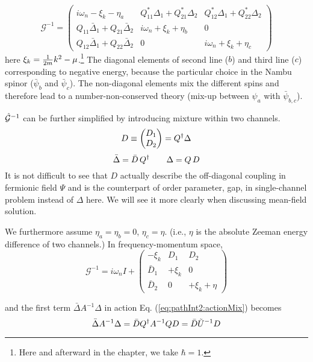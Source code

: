 \begin{equation}\label{eq:pathInt2:nGDeltaK}
\mathcal{G}^{-1}=
\begin{pmatrix}
i\omega_{n}-\xi_{k}-\eta_{a}&Q^{*}_{11}\Delta_{1}+Q^{*}_{21}\Delta_{2}&Q^{*}_{12}\Delta_{1}+Q^{*}_{22}\Delta_{2}\\
Q^{}_{11}\bar\Delta_{1}+Q^{}_{21}\bar\Delta_{2}&i\omega_{n}+\xi_{k}+\eta_{b}&0\\
Q^{}_{12}\bar\Delta_{1}+Q^{}_{22}\bar\Delta_{2}&0&i\omega_{n}+\xi_{k}+\eta_{c}
\end{pmatrix}
\end{equation}
here $\xi_{k}=\frac{1}{2m}k^{2}-\mu$.\footnote{Here and afterward in the chapter, we take $\hbar=1$.} The diagonal elements of second line (${b}$) and third line (${c}$) corresponding to negative energy, because the particular choice in the Nambu spinor ($\bar\psi_{b}$ and $\bar\psi_{c}$).  The non-diagonal elements mix the different spins  and therefore lead to a number-non-conserved theory (mix-up between $\psi_{a}$ with $\bar{\psi}_{b,c}$).  

$\hat{\mathcal{G}}^{-1}$ can be further simplified by introducing mixture within two channels.
\begin{equation}\label{eq:pathInt2:Ddef}
D\equiv\begin{pmatrix}D_{1}\\D_{2}\end{pmatrix}=Q^{\dagger}\Delta
\end{equation}
\begin{equation*}
\bar\Delta=\bar{D}\,Q^{\dagger}\qquad\Delta=Q\,D
\end{equation*}
It is not difficult to see that $D$ actually describe the off-diagonal coupling in fermionic field $\Psi$ and is the counterpart of order parameter, gap, in single-channel problem instead of $\Delta$ here.  We will see it  more clearly when  discussing mean-field solution. 

We furthermore assume $\eta_{a}=\eta_{b}=0$, $\eta_{c}=\eta$. (i.e., $\eta$ is the absolute Zeeman energy difference of two channels.) In frequency-momentum space, 
\begin{equation}\label{eq:pathInt2:nG}
\mathcal{G}^{-1}=i\omega_{n}I+
\begin{pmatrix}
-\xi_{k}&D_{1}&D_{2}\\
\bar{D}_{1}&+\xi_{k}&0\\
\bar{D}_{2}&0&+\xi_{k}+\eta
\end{pmatrix}
\end{equation}
 

and the first term $\bar\Delta{}A^{-1}\Delta$ in action Eq. (\ref{eq:pathInt2:actionMix}) becomes
\[
\bar\Delta{}A^{-1}\Delta=\bar{D}Q^{\dagger}A^{-1}QD=\bar{D}\tilde{U}^{-1}D
\]


